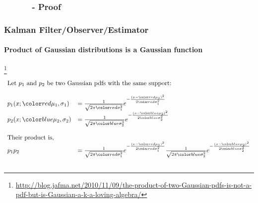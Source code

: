 \documentclass{beamer}
\newenvironment{changemargin}[2]
	{
	  	\begin{list}{}
		{
			\setlength{\topsep}{0pt}%
			\setlength{\leftmargin}{#1}%
			\setlength{\rightmargin}{#2}%
			\setlength{\listparindent}{\parindent}%
			\setlength{\itemindent}{\parindent}%
			\setlength{\parsep}{\parskip}%
		}
	  	\item[]
		}
		{\end{list}
	}
\begin{document}
\subsubsection{\ \ \ \ \ \ - Proof}
\begin{frame}
\frametitle{Kalman Filter/Observer/Estimator}
\framesubtitle{Product of Gaussian distributions is a Gaussian function}

\footnote{\tiny\hspace{-0.23in} \hspace{-0.25in}
\href{http://blog.jafma.net/2010/11/09/the-product-of-two-Gaussian-pdfs-is-not-a-pdf-but-is-Gaussian-a-k-a-loving-algebra/}{http://blog.jafma.net/2010/11/09/the-product-of-two-Gaussian-pdfs-is-not-a-pdf-but-is-Gaussian-a-k-a-loving-algebra/}}
\scriptsize
\begin{equation*}
\begin{array}{llll}
\multicolumn{2}{l}{\textrm{Let $p_1$ and $p_2$ be two Gaussian pdfs with the same support:}}\\\\
p_1(x; \muone, \sone)&=\frac{1}{\sqrt{2 \pi \varone}} e^{-\frac{(x-\muone)^2}{2 \varone}}\\
p_2(x; \mutwo, \stwo)&=\frac{1}{\sqrt{2 \pi \vartwo}} e^{-\frac{(x-\mutwo)^2}{2 \vartwo}}\\\\

\multicolumn{2}{l}{\textrm{Their product is,}}\\
p_1p_2 &=     \frac{1}{\sqrt{2 \pi \varone}} e^{-\frac{(x-\muone)^2}{2 \varone}}    \frac{1}{\sqrt{2 \pi \vartwo}} e^{-\frac{(x-\mutwo)^2}{2 \vartwo}}\\\\
\end{array}
\end{equation*}
\end{frame}
\end{document}
